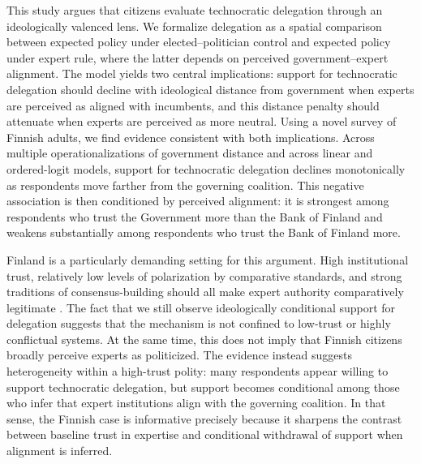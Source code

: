 \documentclass[11pt]{article}\usepackage[]{graphicx}\usepackage[]{xcolor}
\begin{document}
This study argues that citizens evaluate technocratic delegation through an ideologically valenced lens. We formalize delegation as a spatial comparison between expected policy under elected--politician control and expected policy under expert rule, where the latter depends on perceived government--expert alignment. The model yields two central implications: support for technocratic delegation should decline with ideological distance from government when experts are perceived as aligned with incumbents, and this distance penalty should attenuate when experts are perceived as more neutral. Using a novel survey of Finnish adults, we find evidence consistent with both implications. Across multiple operationalizations of government distance and across linear and ordered-logit models, support for technocratic delegation declines monotonically as respondents move farther from the governing coalition. This negative association is then conditioned by perceived alignment: it is strongest among respondents who trust the Government more than the Bank of Finland and weakens substantially among respondents who trust the Bank of Finland more.

Finland is a particularly demanding setting for this argument. High institutional trust, relatively low levels of polarization by comparative standards, and strong traditions of consensus-building should all make expert authority comparatively legitimate \parencite{Bengtsson2009,Rapeli2016,Saarinen2020,Kekkonen2021,Saikkonen2022}. The fact that we still observe ideologically conditional support for delegation suggests that the mechanism is not confined to low-trust or highly conflictual systems. At the same time, this does not imply that Finnish citizens broadly perceive experts as politicized. The evidence instead suggests heterogeneity within a high-trust polity: many respondents appear willing to support technocratic delegation, but support becomes conditional among those who infer that expert institutions align with the governing coalition. In that sense, the Finnish case is informative precisely because it sharpens the contrast between baseline trust in expertise and conditional withdrawal of support when alignment is inferred.
\end{document}
